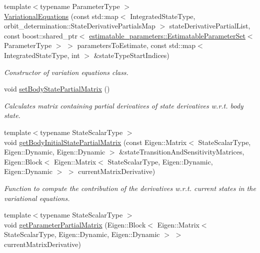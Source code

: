 \begin{DoxyCompactItemize}
\item 
{\footnotesize template$<$typename Parameter\+Type $>$ }\\\hyperlink{classtudat_1_1propagators_1_1VariationalEquations_a82ce800fb140bd255a0c64ccc4c79717}{Variational\+Equations} (const std\+::map$<$ Integrated\+State\+Type, orbit\+\_\+determination\+::\+State\+Derivative\+Partials\+Map $>$ state\+Derivative\+Partial\+List, const boost\+::shared\+\_\+ptr$<$ \hyperlink{classtudat_1_1estimatable__parameters_1_1EstimatableParameterSet}{estimatable\+\_\+parameters\+::\+Estimatable\+Parameter\+Set}$<$ Parameter\+Type $>$ $>$ parameters\+To\+Estimate, const std\+::map$<$ Integrated\+State\+Type, int $>$ \&state\+Type\+Start\+Indices)
\begin{DoxyCompactList}\small\item\em Constructor of variation equations class. \end{DoxyCompactList}\item 
void \hyperlink{classtudat_1_1propagators_1_1VariationalEquations_aee04f729bd529d7e4776723fdfd94655}{set\+Body\+State\+Partial\+Matrix} ()
\begin{DoxyCompactList}\small\item\em Calculates matrix containing partial derivatives of state derivatives w.\+r.\+t. body state. \end{DoxyCompactList}\item 
{\footnotesize template$<$typename State\+Scalar\+Type $>$ }\\void \hyperlink{classtudat_1_1propagators_1_1VariationalEquations_a643e62d98aed13d6322d0c4c3cb4e2c6}{get\+Body\+Initial\+State\+Partial\+Matrix} (const Eigen\+::\+Matrix$<$ State\+Scalar\+Type, Eigen\+::\+Dynamic, Eigen\+::\+Dynamic $>$ \&state\+Transition\+And\+Sensitivity\+Matrices, Eigen\+::\+Block$<$ Eigen\+::\+Matrix$<$ State\+Scalar\+Type, Eigen\+::\+Dynamic, Eigen\+::\+Dynamic $>$ $>$ current\+Matrix\+Derivative)
\begin{DoxyCompactList}\small\item\em Function to compute the contribution of the derivatives w.\+r.\+t. current states in the variational equations. \end{DoxyCompactList}\item 
{\footnotesize template$<$typename State\+Scalar\+Type $>$ }\\void \hyperlink{classtudat_1_1propagators_1_1VariationalEquations_a80a1982caf9c333f07fe7909da4f693e}{get\+Parameter\+Partial\+Matrix} (Eigen\+::\+Block$<$ Eigen\+::\+Matrix$<$ State\+Scalar\+Type, Eigen\+::\+Dynamic, Eigen\+::\+Dynamic $>$ $>$ current\+Matrix\+Derivative)

\end{DoxyCompactItemize}
